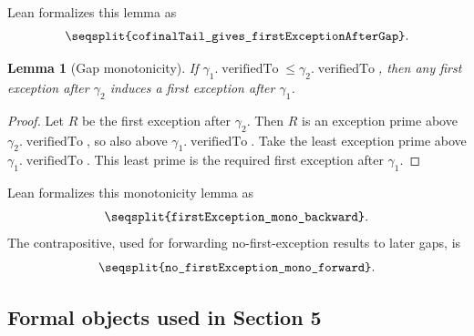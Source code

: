 \documentclass[11pt]{article}
\newtheorem{lemma}[theorem]{Lemma}
\newcommand{\Lean}[1]{\texttt{\seqsplit{#1}}}
\begin{document}
Lean formalizes this lemma as
\[
  \Lean{cofinalTail\_gives\_firstExceptionAfterGap}.
\]

\begin{lemma}[Gap monotonicity]
If \(\gamma_1.\operatorname{verifiedTo}\le
\gamma_2.\operatorname{verifiedTo}\), then any first exception after
\(\gamma_2\) induces a first exception after \(\gamma_1\).
\end{lemma}

\begin{proof}
Let \(R\) be the first exception after \(\gamma_2\).  Then \(R\) is an
exception
prime above \(\gamma_2.\operatorname{verifiedTo}\), so also above
\(\gamma_1.\operatorname{verifiedTo}\).  Take the least exception prime above
\(\gamma_1.\operatorname{verifiedTo}\).  This least prime is the required
first exception after \(\gamma_1\).
\end{proof}

Lean formalizes this monotonicity lemma as
\[
  \Lean{firstException\_mono\_backward}.
\]
The contrapositive, used for forwarding no-first-exception results to later
gaps, is
\[
  \Lean{no\_firstException\_mono\_forward}.
\]

\subsection{Formal objects used in Section 5}
\end{document}
